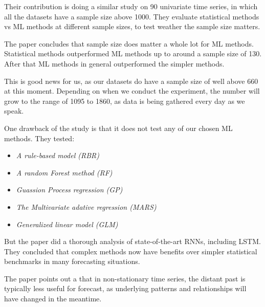 Their contribution is doing a similar study on 90 univariate time series, in which 
all the datasets have a sample size above 1000. They evaluate statistical methods vs ML methods
at different sample sizes, to test weather the sample size matters.

The paper \cite{Cerqueira2019} concludes that sample size does matter a whole lot for ML methods.
Statistical methods outperformed ML methods up to around a sample size of 130. After that ML methods
in general outperformed the simpler methods.

This is good news for us, as our datasets do have a sample size of well above 660 at this moment.
Depending on when we conduct the experiment, the number will grow to the range of 1095 to 1860,
as data is being gathered every day as we speak.

One drawback of the \cite{Makridakis2018} study is that it does not test any of our chosen ML methods.
They tested:
\begin{itemize}
  \item \textit{A rule-based model (RBR)}
  \item \textit{A random Forest method (RF)}
  \item \textit{Guassion Process regression (GP)}
  \item \textit{The Multivariate adative regression (MARS)}
  \item \textit{Generalized linear model (GLM)}
\end{itemize}
But the paper \cite{Hewamalage2021} did a thorough analysis of state-of-the-art RNNs, including LSTM.
They concluded that complex methods now have benefits over simpler statistical benchmarks in many forecasting situations.


The paper \citet{Bandara2017} points out a that in non-stationary time series, the distant past is typically less
useful for forecast, as underlying patterns and relationships will have changed in the meantime.


